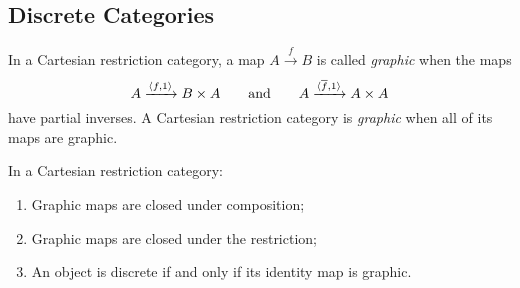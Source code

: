 \subsection{Discrete Categories} %
\label{sub:discrete_categories}

\begin{definition}\label{def:graphic_map}
  In a Cartesian restriction category, a map $A\xrightarrow{f}B$ is called \emph{graphic} when the
  maps
  \[
    A\xrightarrow{\langle f,1\rangle}B\times A\qquad \text{and}\qquad
    A\xrightarrow{\langle\overline{f},1\rangle}A\times A
  \]
  have partial inverses. A Cartesian restriction category is \emph{graphic} when all of its maps
  are graphic.
\end{definition}

\begin{lemma}\label{lem:graphic_maps_are_closed_in_a_cartesian_restriction_category}
  In a Cartesian restriction category:
  \begin{enumerate}[{(}i{)}]
    \item Graphic maps are closed under composition;
    \item Graphic maps are closed under the restriction;
    \item An object is discrete if and only if its identity map is graphic.
  \end{enumerate}
\end{lemma}
